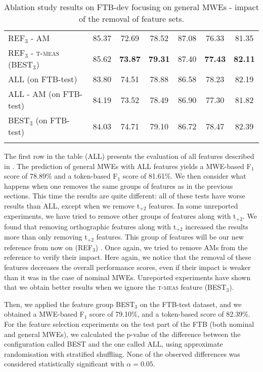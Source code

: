 \documentclass[output=paper,modfonts]{langscibook}
\begin{document}
\begin{table*}
\begin{tabular}{l@{~~~}c@{~~~}c@{~~~}c@{~~~~~~~~}c@{~~~}c@{~~~}c}
\textsc{REF$_3$} - \textsc{AM}  & 85.37  & 72.69  & 78.52  & 87.08  & 76.33  & 81.35  \\ %
\textsc{REF$_3$} - \textsc{t-meas} (\textsc{BEST$_3$}) & 85.62 & \textbf{73.87} & \textbf{79.31} & 87.40 & \textbf{77.43} & \textbf{82.11} \\ %
\lspbottomrule
\textsc{ALL} (on FTB-test) & 83.80 & 74.51 & 78.88 & 86.58 & 78.23 & 82.19 \\ 
\textsc{ALL - \textsc{AM}} (on FTB-test) & 84.19 & 73.52 & 78.49 & 86.90 & 77.30 & 81.82 \\ 
\textsc{BEST$_3$} (on FTB-test) & 84.03 & 74.71 & 79.10 & 86.72 & 78.47 & 82.39 \\ 
\lspbottomrule
\end{tabular}
\caption{Ablation study results on FTB-dev focusing on general MWEs - impact of the removal of feature sets.}
\label{tab:ftbAllMWEsCoarse}
\end{table*}

The first row in the table (ALL) presents the evaluation of all features described in . The prediction of general MWEs with ALL features yields a MWE-based F$_1$ score of 78.89\% and a token-based F$_1$ score of 81.61\%.
We then consider what happens when one removes the same groups of features as in the previous sections. This time the results are quite different: all of these tests have worse results than ALL, except when we remove t$_{+2}$ features. In some unreported experiments, we have tried to remove other groups of features along with t$_{+2}$. We found that removing orthographic features along with t$_{+2}$ increased the results more than only removing t$_{+2}$ features. This group of features will be our new reference from now on (REF$_3$)%
. Once again, we tried to remove AMs from the reference to verify their impact. Here again, we notice that the removal of these features decreases the overall performance scores, even if their impact is weaker than it was in the case of nominal MWEs. 
Unreported experiments have shown that we obtain better results when we ignore the \textsc{t-meas} feature (BEST$_3$). 

Then, we applied the feature group BEST$_3$ on the FTB-test dataset, and we obtained a MWE-based F$_1$ score of 79.10\%, and a token-based score of 82.39\%. 
For the feature selection experiments on the test part of the FTB (both nominal and general MWEs), we calculated the p-value of the difference between the configuration called BEST and the one called ALL, using approximate randomisation with stratified shuffling. None of the observed differences was considered statistically significant with $\alpha=0.05$.
\end{document}
